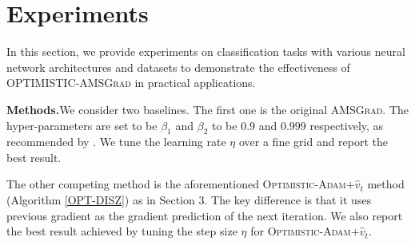 \documentclass[11pt]{article}
\theoremstyle{k}
\begin{document}
\section{Experiments}

In this section, we provide experiments on classification tasks with various neural network architectures and datasets to demonstrate the effectiveness of \textsc{OPTIMISTIC-AMSGrad} in practical applications.

\textbf{Methods.}\hspace{0.1in}We consider two baselines. The first one is the original \textsc{AMSGrad}. 
The hyper-parameters are set to be $\beta_1$ and $\beta_2$ to be $0.9$ and $0.999$ respectively, as recommended by \cite{RKK18}. We tune the learning rate $\eta$ over a fine grid and report the best result. 

The other competing method is the aforementioned
\textsc{Optimistic-Adam$+\hat{v}_t$} method (Algorithm \ref{OPT-DISZ}) as in Section 3. The key difference is that it uses previous gradient as the gradient prediction of the next iteration. We also report the best result achieved by tuning the step size $\eta$ for \textsc{Optimistic-Adam$+\hat{v}_t$}.
\end{document}
